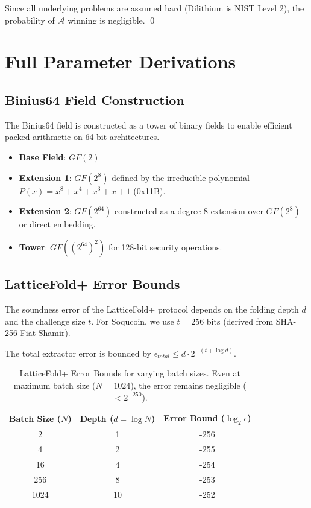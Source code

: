 \documentclass[10pt]{article}
\begin{document}
Since all underlying problems are assumed hard (Dilithium is NIST Level 2), the probability of $\mathcal{A}$ winning is negligible. \qed

\clearpage

\section{Full Parameter Derivations}
\label{app:params}

\subsection{Binius64 Field Construction}
The Binius64 field is constructed as a tower of binary fields to enable efficient packed arithmetic on 64-bit architectures.

\begin{itemize}
    \item \textbf{Base Field}: $GF(2)$
    \item \textbf{Extension 1}: $GF(2^8)$ defined by the irreducible polynomial $P(x) = x^8 + x^4 + x^3 + x + 1$ (0x11B).
    \item \textbf{Extension 2}: $GF(2^{64})$ constructed as a degree-8 extension over $GF(2^8)$ or direct embedding.
    \item \textbf{Tower}: $GF((2^{64})^2)$ for 128-bit security operations.
\end{itemize}

\subsection{LatticeFold+ Error Bounds}
The soundness error of the LatticeFold+ protocol depends on the folding depth $d$ and the challenge size $t$. For Soqucoin, we use $t=256$ bits (derived from SHA-256 Fiat-Shamir).

The total extractor error is bounded by $\epsilon_{total} \leq d \cdot 2^{-(t + \log d)}$.

\begin{table}[h]
\centering
\begin{tabular}{ccc}
\toprule
Batch Size ($N$) & Depth ($d = \log N$) & Error Bound ($\log_2 \epsilon$) \\
\midrule
2 & 1 & -256 \\
4 & 2 & -255 \\
16 & 4 & -254 \\
256 & 8 & -253 \\
1024 & 10 & -252 \\
\bottomrule
\end{tabular}
\caption{LatticeFold+ Error Bounds for varying batch sizes. Even at maximum batch size ($N=1024$), the error remains negligible ($< 2^{-250}$).}
\label{tab:error-bounds}
\end{table}
\end{document}
